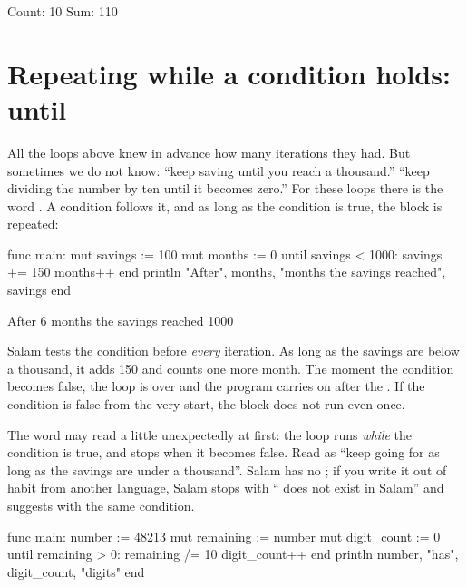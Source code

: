 \begin{salamout}
Count: 10 Sum: 110
\end{salamout}

\section{Repeating while a condition holds: until}

All the loops above knew in advance how many iterations they had. But
sometimes we do not know: ``keep saving until you reach a thousand.'' ``keep
dividing the number by ten until it becomes zero.'' For these loops there is
the word . A condition follows it, and as long as the condition
is true, the block is repeated:

\begin{salamcode}
func main:
    mut savings := 100
    mut months := 0
    until savings < 1000:
        savings += 150
        months++
    end
    println "After", months, "months the savings reached", savings
end
\end{salamcode}

\begin{salamout}
After 6 months the savings reached 1000
\end{salamout}

Salam tests the condition before \emph{every} iteration. As long as the
savings are below a thousand, it adds 150 and counts one more month. The
moment the condition becomes false, the loop is over and the program carries
on after the . If the condition is false from the very start, the
block does not run even once.

\begin{note}
The word  may read a little unexpectedly at first: the loop
runs \emph{while} the condition is true, and stops when it becomes false.
Read  as ``keep going for as long as the
savings are under a thousand''. Salam has no ; if you write it
out of habit from another language, Salam stops with `` does
not exist in Salam'' and suggests  with the same condition.
\end{note}

\begin{salamcode}
func main:
    number := 48213
    mut remaining := number
    mut digit_count := 0
    until remaining > 0:
        remaining /= 10
        digit_count++
    end
    println number, "has", digit_count, "digits"
end
\end{salamcode}

